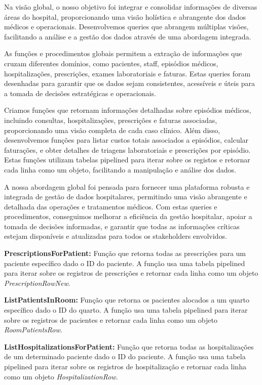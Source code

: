 Na visão global, o nosso objetivo foi integrar e consolidar informações de diversas áreas do hospital, proporcionando uma visão holística e abrangente dos dados médicos e operacionais. Desenvolvemos queries que abrangem múltiplas visões, facilitando a análise e a gestão dos dados através de uma abordagem integrada.

As funções e procedimentos globais permitem a extração de informações que cruzam diferentes domínios, como pacientes, staff, episódios médicos, hospitalizações, prescrições, exames laboratoriais e faturas. Estas queries foram desenhadas para garantir que os dados sejam consistentes, acessíveis e úteis para a tomada de decisões estratégicas e operacionais.

Criamos funções que retornam informações detalhadas sobre episódios médicos, incluindo consultas, hospitalizações, prescrições e faturas associadas, proporcionando uma visão completa de cada caso clínico. Além disso, desenvolvemos funções para listar custos totais associados a episódios, calcular faturações, e obter detalhes de triagens laboratoriais e prescrições por episódio. Estas funções utilizam tabelas pipelined para iterar sobre os registos e retornar cada linha como um objeto, facilitando a manipulação e análise dos dados.

A nossa abordagem global foi pensada para fornecer uma plataforma robusta e integrada de gestão de dados hospitalares, permitindo uma visão abrangente e detalhada das operações e tratamentos médicos. Com estas queries e procedimentos, conseguimos melhorar a eficiência da gestão hospitalar, apoiar a tomada de decisões informadas, e garantir que todas as informações críticas estejam disponíveis e atualizadas para todos os stakeholders envolvidos.

\vspace{0.15cm}
\textbf{PrescriptionsForPatient:} Função que retorna todas as prescrições para um paciente específico dado o ID do paciente. A função usa uma tabela pipelined para iterar sobre os registros de prescrições e retornar cada linha como um objeto \textit{PrescriptionRowNew}.

\vspace{0.15cm}
\textbf{ListPatientsInRoom:} Função que retorna os pacientes alocados a um quarto específico dado o ID do quarto. A função usa uma tabela pipelined para iterar sobre os registros de pacientes e retornar cada linha como um objeto \textit{RoomPatientsRow}.

\vspace{0.15cm}
\textbf{ListHospitalizationsForPatient:} Função que retorna todas as hospitalizações de um determinado paciente dado o ID do paciente. A função usa uma tabela pipelined para iterar sobre os registros de hospitalização e retornar cada linha como um objeto \textit{HospitalizationRow}.

